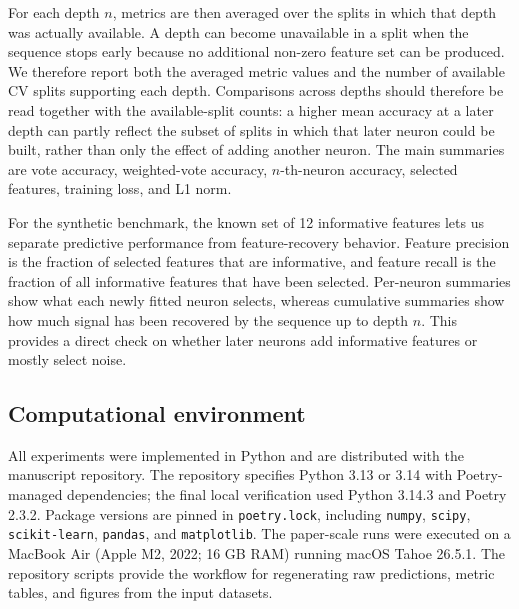 For each depth $n$, metrics are then averaged over the splits in which that depth was actually available.
A depth can become unavailable in a split when the sequence stops early because no additional non-zero feature
set can be produced. We therefore report both the averaged metric values and the number of available CV splits
supporting each depth. Comparisons across depths should therefore be read together with the available-split
counts: a higher mean accuracy at a later depth can partly reflect the subset of splits in which that later
neuron could be built, rather than only the effect of adding another neuron. The main summaries are vote
accuracy, weighted-vote accuracy, $n$-th-neuron accuracy, selected features, training loss, and L1 norm.

For the synthetic benchmark, the known set of 12 informative features lets us separate predictive performance
from feature-recovery behavior. Feature precision is the fraction of selected features that are informative,
and feature recall is the fraction of all informative features that have been selected. Per-neuron summaries
show what each newly fitted neuron selects, whereas cumulative summaries show how much signal has been recovered
by the sequence up to depth $n$. This provides a direct check on whether later neurons add informative features
or mostly select noise.

\subsection*{Computational environment}
All experiments were implemented in Python and are distributed with the manuscript repository. The repository
specifies Python 3.13 or 3.14 with Poetry-managed dependencies; the final local verification used
Python 3.14.3 and Poetry 2.3.2. Package versions are pinned in \texttt{poetry.lock}, including
\texttt{numpy}, \texttt{scipy}, \texttt{scikit-learn}, \texttt{pandas}, and \texttt{matplotlib}. The paper-scale
runs were executed on a MacBook Air (Apple M2, 2022; 16 GB RAM) running macOS Tahoe 26.5.1. The repository
scripts provide the workflow for regenerating raw predictions, metric tables, and figures from the input
datasets.
